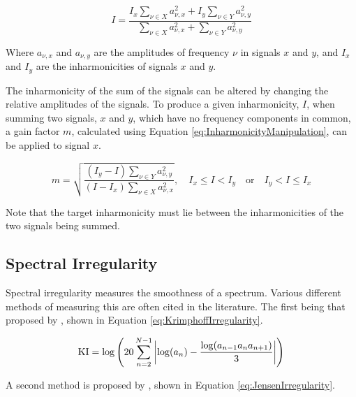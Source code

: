 		\begin{equation}
			I = \frac{I_{x}\sum_{\nu \in X} a_{\nu,x}^{2} + I_{y}\sum_{\nu \in Y} a_{\nu,y}^{2}}
			         {\sum_{\nu \in X} a_{\nu,x}^{2} + \sum_{\nu \in Y} a_{\nu,y}^{2}}
			\label{eq:InharmonicitySum}
		\end{equation}

		Where $a_{\nu,x}$ and $a_{\nu,y}$ are the amplitudes of frequency $\nu$ in signals $x$ and $y$, and $I_{x}$
		and $I_{y}$ are the inharmonicities of signals $x$ and $y$.

		The inharmonicity of the sum of the signals can be altered by changing the relative amplitudes of the
		signals. To produce a given inharmonicity, $I$, when summing two signals, $x$ and $y$, which have no
		frequency components in common, a gain factor $m$, calculated using Equation
		\ref{eq:InharmonicityManipulation}, can be applied to signal $x$.

		\begin{equation}
			m = \sqrt{\frac{(I_{y} - I)\sum_{\nu \in Y} a_{\nu,y}^{2}}
			               {(I - I_{x})\sum_{\nu \in X} a_{\nu,x}^{2}}},
			\quad I_{x} \leq I < I_{y} \quad \textrm{or} \quad I_{y} < I \leq I_{x}
			\label{eq:InharmonicityManipulation}
		\end{equation}

		Note that the target inharmonicity must lie between the inharmonicities of the two signals being summed.

	\subsection{Spectral Irregularity}
	\label{sec:FeatureControl-Parameterisation-Irregularity}
		Spectral irregularity measures the smoothness of a spectrum. Various different methods of measuring this
		are often cited in the literature. The first being that proposed by \citet{krimphoff1994caracterisation},
		shown in Equation \ref{eq:KrimphoffIrregularity}.

		\begin{equation}
			\textrm{KI} = \log \left( 20 \sum_{n = 2}^{N - 1}
				                  \left|\log(a_{n}) - \frac{\log(a_{n-1}a_{n}a_{n+1})}
				                                             {3}\right|
					   \right)
			\label{eq:KrimphoffIrregularity}
		\end{equation}

		A second method is proposed by \citet{jensen1999timbre}, shown in Equation \ref{eq:JensenIrregularity}.

